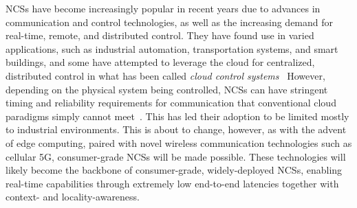 \glspl{NCS} have become increasingly popular in recent years due to advances in communication and control technologies, as well as the increasing demand for real-time, remote, and distributed control.
They have found use in varied applications, such as industrial automation, transportation systems, and smart buildings, and some have attempted to leverage the cloud for centralized, distributed control in what has been called \emph{cloud control systems}~\cite{xia2015cloud}
However, depending on the physical system being controlled, \glspl{NCS} can have stringent timing and reliability requirements for communication that conventional cloud paradigms simply cannot meet~\cite{wan2020efficient}.
This has led their adoption to be limited mostly to industrial environments.
This is about to change, however, as with the advent of edge computing, paired with novel wireless communication technologies such as cellular 5G, consumer-grade \glspl{NCS} will be made possible.
These technologies will likely become the backbone of consumer-grade, widely-deployed \glspl{NCS}, enabling real-time capabilities through extremely low end-to-end latencies together with context- and locality-awareness.
